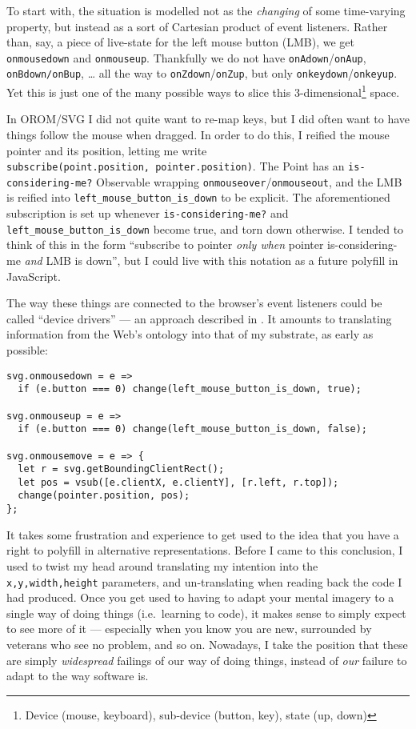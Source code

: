 To start with, the situation is modelled not as the \emph{changing} of
some time-varying property, but instead as a sort of Cartesian product
of event listeners. Rather than, say, a piece of live-state for the left
mouse button (LMB), we get \texttt{onmousedown} and \texttt{onmouseup}.
Thankfully we do not have \texttt{onAdown}/\texttt{onAup},
\texttt{onBdown/onBup}, \ldots{} all the way to
\texttt{onZdown}/\texttt{onZup}, but only
\texttt{onkeydown}/\texttt{onkeyup}. Yet this is just one of the many
possible ways to slice this 3-dimensional\footnote{Device (mouse,
  keyboard), sub-device (button, key), state (up, down)} space.

In OROM/SVG I did not quite want to re-map keys, but I did often want to
have things follow the mouse when dragged. In order to do this, I
reified the mouse pointer and its position, letting me write
\texttt{subscribe(point.position,\ pointer.position)}. The Point has an
\texttt{is-considering-me?} Observable wrapping
\texttt{onmouseover}/\texttt{onmouseout}, and the LMB is reified into
\texttt{left\_mouse\_button\_is\_down} to be explicit. The
aforementioned subscription is set up whenever
\texttt{is-considering-me?} and \texttt{left\_mouse\_button\_is\_down}
become true, and torn down otherwise. I tended to think of this in the
form ``subscribe to pointer \emph{only when} pointer is-considering-me
\emph{and} LMB is down'', but I could live with this notation as a
future polyfill in JavaScript.

The way these things are connected to the browser's event listeners
could be called ``device drivers'' --- an approach described in
\cite{prog21-bbox}. It amounts to translating information from the Web's
ontology into that of my substrate, as early as possible:

\begin{lstlisting}
svg.onmousedown = e =>
  if (e.button === 0) change(left_mouse_button_is_down, true);

svg.onmouseup = e =>
  if (e.button === 0) change(left_mouse_button_is_down, false);

svg.onmousemove = e => {
  let r = svg.getBoundingClientRect();
  let pos = vsub([e.clientX, e.clientY], [r.left, r.top]);
  change(pointer.position, pos);
};
\end{lstlisting}

It takes some frustration and experience to get used to the idea that
you have a right to polyfill in alternative representations. Before I
came to this conclusion, I used to twist my head around translating my
intention into the \texttt{x,y,width,height} parameters, and
un-translating when reading back the code I had produced. Once you get
used to having to adapt your mental imagery to a single way of doing
things (i.e.~learning to code), it makes sense to simply expect to see
more of it --- especially when you know you are new, surrounded by
veterans who see no problem, and so on. Nowadays, I take the position
that these are simply \emph{widespread} failings of our way of doing
things, instead of \emph{our} failure to adapt to the way software is.

